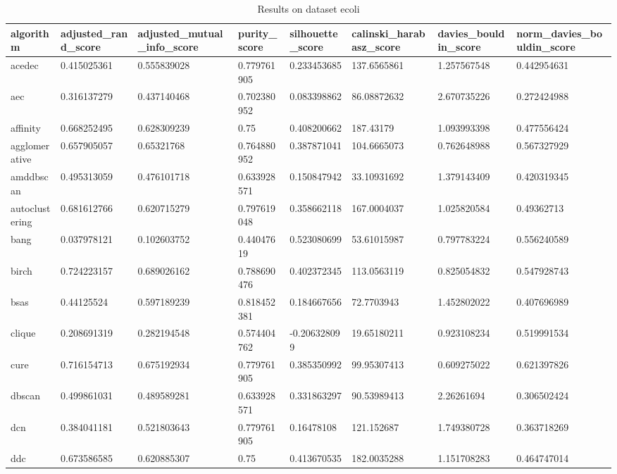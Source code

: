 \clearpage

\begin{table}[H]
\centering
\caption{Results on dataset ecoli}
\label{S61_Table}
\begin{tabular}{|l|l|l|l|l|l|l|l|}
\hline
algorithm & adjusted\_rand\_score & adjusted\_mutual\_info\_score & purity\_score & silhouette\_score & calinski\_harabasz\_score & davies\_bouldin\_score & norm\_davies\_bouldin\_score \\
\hline
acedec & 0.415025361 & 0.555839028 & 0.779761905 & 0.233453685 & 137.6565861 & 1.257567548 & 0.442954631 \\
\hline
aec & 0.316137279 & 0.437140468 & 0.702380952 & 0.083398862 & 86.08872632 & 2.670735226 & 0.272424988 \\
\hline
affinity & 0.668252495 & 0.628309239 & 0.75 & 0.408200662 & 187.43179 & 1.093993398 & 0.477556424 \\
\hline
agglomerative & 0.657905057 & 0.65321768 & 0.764880952 & 0.387871041 & 104.6665073 & 0.762648988 & 0.567327929 \\
\hline
amddbscan & 0.495313059 & 0.476101718 & 0.633928571 & 0.150847942 & 33.10931692 & 1.379143409 & 0.420319345 \\
\hline
autoclustering & 0.681612766 & 0.620715279 & 0.797619048 & 0.358662118 & 167.0004037 & 1.025820584 & 0.49362713 \\
\hline
bang & 0.037978121 & 0.102603752 & 0.44047619 & 0.523080699 & 53.61015987 & 0.797783224 & 0.556240589 \\
\hline
birch & 0.724223157 & 0.689026162 & 0.788690476 & 0.402372345 & 113.0563119 & 0.825054832 & 0.547928743 \\
\hline
bsas & 0.44125524 & 0.597189239 & 0.818452381 & 0.184667656 & 72.7703943 & 1.452802022 & 0.407696989 \\
\hline
clique & 0.208691319 & 0.282194548 & 0.574404762 & -0.206328099 & 19.65180211 & 0.923108234 & 0.519991534 \\
\hline
cure & 0.716154713 & 0.675192934 & 0.779761905 & 0.385350992 & 99.95307413 & 0.609275022 & 0.621397826 \\
\hline
dbscan & 0.499861031 & 0.489589281 & 0.633928571 & 0.331863297 & 90.53989413 & 2.26261694 & 0.306502424 \\
\hline
dcn & 0.384041181 & 0.521803643 & 0.779761905 & 0.16478108 & 121.152687 & 1.749380728 & 0.363718269 \\
\hline
ddc & 0.673586585 & 0.620885307 & 0.75 & 0.413670535 & 182.0035288 & 1.151708283 & 0.464747014 \\

\end{tabular}
\end{table}

